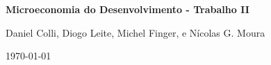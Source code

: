 \documentclass[12pt]{article}
\numberwithin{equation}{section}
\numberwithin{figure}{section}
\numberwithin{table}{section}
\numberwithin{theorem}{section}
\begin{document}
\thispagestyle{empty}

\begin{center}
    \large{\textbf{Microeconomia do Desenvolvimento - Trabalho II}}
\end{center}

\begin{center}
    \large{Daniel Colli, Diogo Leite, Michel Finger, e Nícolas G. Moura}
\end{center}

\begin{center}
    \large{\today}
\end{center}




\newpage

\end{document}
